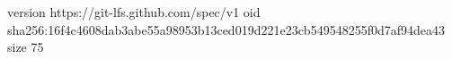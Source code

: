 version https://git-lfs.github.com/spec/v1
oid sha256:16f4c4608dab3abe55a98953b13ced019d221e23cb549548255f0d7af94dea43
size 75
